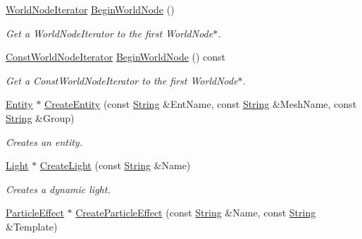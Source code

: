 \begin{DoxyCompactItemize}
\hyperlink{classMezzanine_1_1SceneManager_a498b2390acb176a185e1026d23b773f0}{WorldNodeIterator} \hyperlink{classMezzanine_1_1SceneManager_a6b3844dcb5e3e4df4e50b47fb6158960}{BeginWorldNode} ()
\begin{DoxyCompactList}\small\item\em Get a WorldNodeIterator to the first WorldNode$\ast$. \item\end{DoxyCompactList}\item 
\hyperlink{classMezzanine_1_1SceneManager_ad60b6e15daa2395944d395b4e307b905}{ConstWorldNodeIterator} \hyperlink{classMezzanine_1_1SceneManager_a0d374c51309d155a1e49fd033e863111}{BeginWorldNode} () const 
\begin{DoxyCompactList}\small\item\em Get a ConstWorldNodeIterator to the first WorldNode$\ast$. \item\end{DoxyCompactList}\item 
\hyperlink{classMezzanine_1_1Entity}{Entity} $\ast$ \hyperlink{classMezzanine_1_1SceneManager_a3bb0d7b70e9a01090602c9caa005325a}{CreateEntity} (const \hyperlink{namespaceMezzanine_acf9fcc130e6ebf08e3d8491aebcf1c86}{String} \&EntName, const \hyperlink{namespaceMezzanine_acf9fcc130e6ebf08e3d8491aebcf1c86}{String} \&MeshName, const \hyperlink{namespaceMezzanine_acf9fcc130e6ebf08e3d8491aebcf1c86}{String} \&Group)
\begin{DoxyCompactList}\small\item\em Creates an entity. \item\end{DoxyCompactList}\item 
\hyperlink{classMezzanine_1_1Light}{Light} $\ast$ \hyperlink{classMezzanine_1_1SceneManager_a33a91afe11a91a778d9b0139a06f3d0a}{CreateLight} (const \hyperlink{namespaceMezzanine_acf9fcc130e6ebf08e3d8491aebcf1c86}{String} \&Name)
\begin{DoxyCompactList}\small\item\em Creates a dynamic light. \item\end{DoxyCompactList}\item 
\hyperlink{classMezzanine_1_1ParticleEffect}{ParticleEffect} $\ast$ \hyperlink{classMezzanine_1_1SceneManager_a7c7e0b3f993c531bcdd9a6dd9135178d}{CreateParticleEffect} (const \hyperlink{namespaceMezzanine_acf9fcc130e6ebf08e3d8491aebcf1c86}{String} \&Name, const \hyperlink{namespaceMezzanine_acf9fcc130e6ebf08e3d8491aebcf1c86}{String} \&Template)

\end{DoxyCompactItemize}
